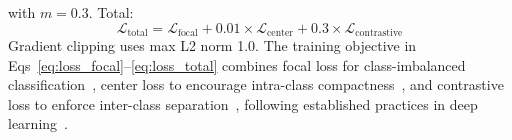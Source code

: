 \documentclass[10pt,letterpaper]{article}
\begin{document}
                                                                                                                  with $m=0.3$. Total:
                                                                                                                  \begin{equation}
                                                                                                                  \label{eq:loss_total}
                                                                                                                  \mathcal{L}_{\text{total}}=
                                                                                                                  \mathcal{L}_{\text{focal}} + 0.01\times\mathcal{L}_{\text{center}} + 0.3\times\mathcal{L}_{\text{contrastive}}
                                                                                                                  \end{equation}
                                                                                                                  Gradient clipping uses max L2 norm 1.0. 
                                                                                                                  The training objective in Eqs~\ref{eq:loss_focal}--\ref{eq:loss_total} combines focal loss for class-imbalanced classification~\cite{ref53}, center loss to encourage intra-class compactness~\cite{ref54}, and contrastive loss to enforce inter-class separation~\cite{ref55}, following established practices in deep learning~\cite{ref50}.
\end{document}
